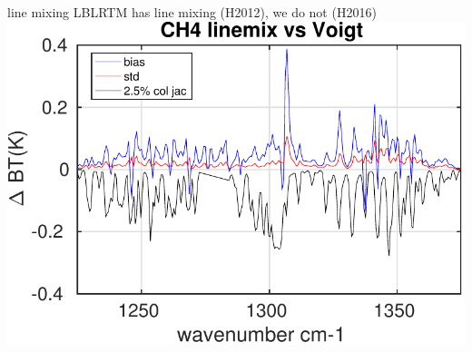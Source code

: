 \documentclass[10pt,t]{beamer}
\begin{document}
\begin{frame}
\begin{columns}
    \begin{column}{0.55\columnwidth}
      \begin{block}{\methane line mixing}
        \small  LBLRTM has \methane line mixing (H2012), we do not (H2016)\\
        \vspace{0.2in}
        \includegraphics[width=\linewidth]{Figs/FigsH16_G15/ch4linemix3.pdf}
      \end{block}
    \end{column}

  \end{columns}

\end{frame}
\end{document}
